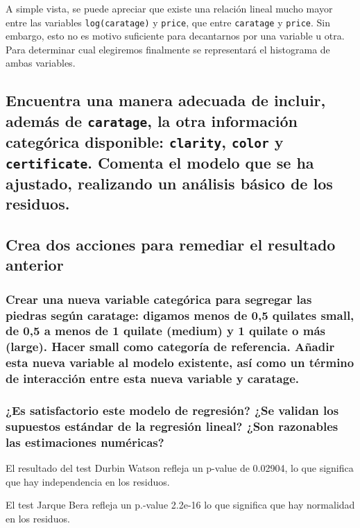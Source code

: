 \documentclass[a4paper, 9pt]{article}
\begin{document}
A simple vista, se puede apreciar que existe una relación lineal mucho mayor entre las variables \texttt{log(caratage)} y \texttt{price}, que entre \texttt{caratage} y \texttt{price}. Sin embargo, esto no es motivo suficiente para decantarnos por una variable u otra. Para determinar cual elegiremos finalmente se representará el histograma de ambas variables.


\subsection{Encuentra una manera adecuada de incluir, además de \texttt{caratage}, la otra información categórica disponible: \texttt{clarity}, \texttt{color} y \texttt{certificate}. Comenta el modelo que se ha ajustado, realizando un análisis básico de los residuos.}
\label{subsec:question-2}


\subsection{Crea dos acciones para remediar el resultado anterior}
\label{subsec:question-3}

\subsubsection{Crear una nueva variable categórica para segregar las piedras según caratage: digamos menos de 0,5 quilates small, de 0,5 a menos de 1 quilate (medium) y 1 quilate o más (large). Hacer small como categoría de referencia. Añadir esta nueva variable al modelo existente, así como un término de interacción entre esta nueva variable y caratage.}


\subsubsection{¿Es satisfactorio este modelo de regresión? ¿Se validan los supuestos estándar de la regresión lineal? ¿Son razonables las estimaciones numéricas?}

El resultado del test Durbin Watson refleja un p-value de 0.02904, lo que significa que hay independencia en los residuos.

El test Jarque Bera refleja un p.-value 2.2e-16 lo que significa que hay normalidad en los residuos.
\end{document}
